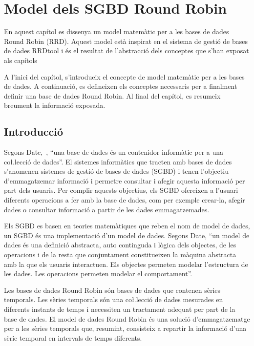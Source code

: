 \chapter[Model RRD]{Model dels SGBD Round Robin}\label{cap:model-rrd}

En aquest capítol es dissenya un model matemàtic per a les bases de dades Round Robin (RRD). Aquest model està inspirat en el sistema de gestió de bases de dades RRDtool i és el resultat de l'abstracció dels conceptes que s'han exposat als capítols %

A l'inici del capítol, s'introdueix el concepte de model matemàtic per a les bases de dades. 
A continuació, es defineixen els conceptes necessaris per a finalment definir una base de dades Round Robin. 
Al final del capítol, es resumeix breument la informació exposada.

  

\section{Introducció}

Segons Date,~\cite{date}, ``una base de dades és un contenidor informàtic per a una co\l.lecció de dades''. El sistemes informàtics que tracten amb bases de dades s'anomenen sistemes de gestió de bases de dades (SGBD) i tenen l'objectiu d'emmagatzemar informació i permetre consultar i afegir aquesta informació  per part dels usuaris.
Per complir aquests objectius, els SGBD ofereixen a l'usuari diferents operacions a fer amb la base de dades, com per exemple crear-la, afegir dades o consultar informació a partir de les dades emmagatzemades.

Els SGBD es basen en teories matemàtiques que reben el nom de model de dades, un SGBD és una implementació d'un model de dades.
Segons Date, ``un model de dades és una definició abstracta, auto continguda i lògica dels objectes, de les operacions i  de la resta que conjuntament constitueixen la màquina abstracta amb la que els usuaris interactuen. Els objectes permeten modelar l'estructura de les dades. Les operacions permeten modelar el comportament''.

Les bases de dades Round Robin són bases de dades que contenen sèries temporals. Les sèries temporals són una co\l.lecció de dades mesurades en diferents instants de temps i necessiten un tractament adequat per part de la base de dades. 
El model de dades Round Robin és una solució d'emmagatzematge per a les sèries temporals que, resumint, consisteix a repartir la informació d'una sèrie temporal en intervals de temps diferents.

